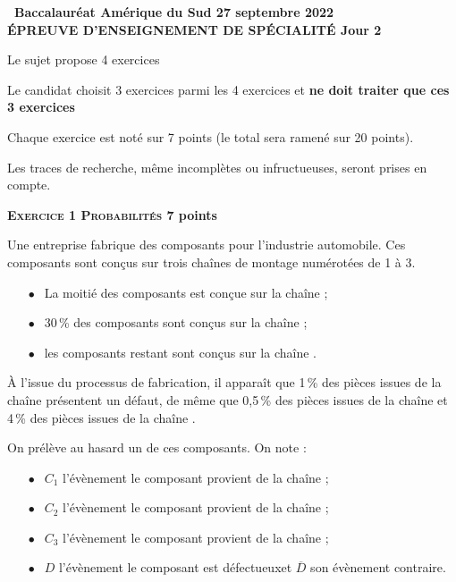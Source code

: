 \documentclass[10pt,a4paper]{article}
\begin{document}
\label{AmeriSud2}

\pagestyle{fancy}
\thispagestyle{empty}

\begin{center}{\Large\textbf{\decofourleft~Baccalauréat Amérique du Sud 27 septembre 2022~\decofourright\\[6pt] ÉPREUVE D'ENSEIGNEMENT DE SPÉCIALITÉ Jour 2}}
\end{center}

\vspace{0,25cm}

Le sujet propose 4 exercices

Le candidat choisit 3 exercices parmi les 4 exercices et \textbf{ne doit traiter que ces 3 exercices}

\medskip

Chaque exercice est noté sur 7 points (le total sera ramené sur 20 points).

Les traces de recherche, même incomplètes ou infructueuses, seront prises en compte.

\bigskip

\textbf{\textsc{Exercice 1 Probabilités} \hfill 7 points}

\medskip

Une entreprise fabrique des composants pour l'industrie automobile. Ces composants sont conçus sur trois chaînes de montage numérotées de 1 à 3.
\begin{itemize}
\item[$\bullet~~$] La moitié des composants est conçue sur la chaîne  ;
\item[$\bullet~~$]  30\,\% des composants sont conçus sur la chaîne ;
\item[$\bullet~~$]  les composants restant sont conçus sur la chaîne .
\end{itemize}

À l'issue du processus de fabrication, il apparaît que 1\,\% des pièces issues de la chaîne  présentent un défaut, de même que 0,5\,\% des pièces issues de la chaîne  et 4\,\% des pièces issues de la chaîne .

On prélève au hasard un de ces composants. On note :

\begin{itemize}
\item[$\bullet~~$] $C_1$ l'évènement \og le composant provient de la chaîne  \fg{} ;
\item[$\bullet~~$] $C_2$ l'évènement \og le composant provient de la chaîne  \fg{} ;
\item[$\bullet~~$] $C_3$ l'évènement \og le composant provient de la chaîne  \fg{} ;
\item[$\bullet~~$] $D$ l'évènement \og le composant est défectueux\fg et $\overline{D}$ son évènement contraire.
\end{itemize}
\end{document}
